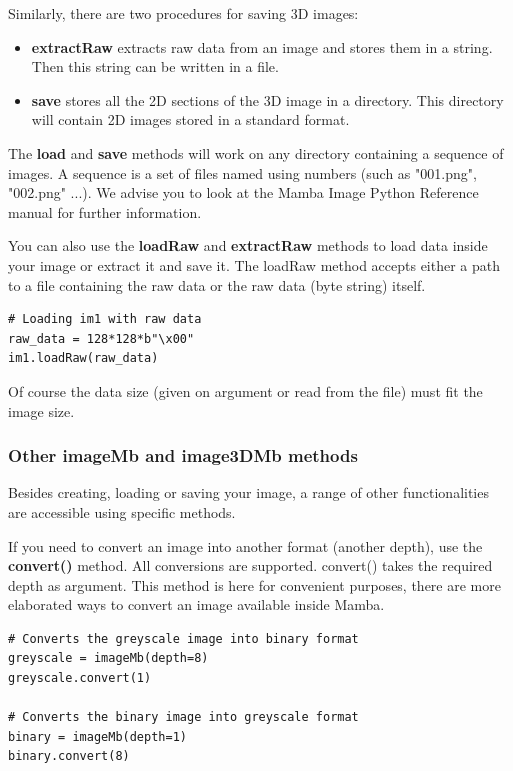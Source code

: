 \documentclass[a4paper,10pt,oneside]{article}
\begin{document}
Similarly, there are two procedures for saving 3D images:

\begin{itemize}
\item \textbf{extractRaw} extracts raw data from an image and stores them in a string. Then this string can be
written in a file.  
\item \textbf{save} stores all the 2D sections of the 3D image in a directory. This directory will contain 2D images
stored in a standard format.
\end{itemize}

The \textbf{load} and \textbf{save} methods will work on any directory containing
a sequence of images. A sequence is a set of files named using numbers (such
as "001.png", "002.png" ...). We advise you to look at the Mamba Image Python Reference
manual for further information.

You can also use the \textbf{loadRaw} and \textbf{extractRaw} methods to load data inside your
image or extract it and save it. The loadRaw method accepts either a path to a
file containing the raw data or the raw data (byte string) itself.

\lstset{language=Python}
\begin{lstlisting}
# Loading im1 with raw data
raw_data = 128*128*b"\x00"
im1.loadRaw(raw_data)
\end{lstlisting}

Of course the data size (given on argument or read from the file) must fit the
image size.

\subsubsection{Other imageMb and image3DMb methods}

Besides creating, loading or saving your image, a range of other functionalities
are accessible using specific methods.

If you need to convert an image into another format (another depth), use the 
\textbf{convert()} method. All conversions are supported. convert() takes the required
depth as argument. This method is here for convenient purposes, there are more
elaborated ways to convert an image available inside Mamba.

\lstset{language=Python}
\begin{lstlisting}
# Converts the greyscale image into binary format
greyscale = imageMb(depth=8)
greyscale.convert(1)

# Converts the binary image into greyscale format
binary = imageMb(depth=1)
binary.convert(8)
\end{lstlisting}
\end{document}
